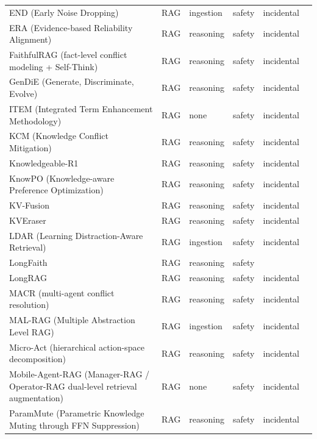 \begin{longtable}{@{}>{\raggedright\arraybackslash}p{}lllll@{}}
END (Early Noise Dropping) & RAG & ingestion & safety & incidental & \cite{jin-2025-end} \\
ERA (Evidence-based Reliability Alignment) & RAG & reasoning & safety & incidental & \cite{shin-2026-era} \\
FaithfulRAG (fact-level conflict modeling + Self-Think) & RAG & reasoning & safety & incidental & \cite{zhang-2025-faithfulrag} \\
GenDiE (Generate, Discriminate, Evolve) & RAG & reasoning & safety & incidental & \cite{li-2025-generate} \\
ITEM (Integrated Term Enhancement Methodology) & RAG & none & safety & incidental & \cite{bei-2024-manufacturing} \\
KCM (Knowledge Conflict Mitigation) & RAG & reasoning & safety & incidental & \cite{an-2026-enhancing} \\
Knowledgeable-R1 & RAG & reasoning & safety & incidental & \cite{lin-2025-resisting} \\
KnowPO (Knowledge-aware Preference Optimization) & RAG & reasoning & safety & incidental & \cite{zhang-2024-knowpo} \\
KV-Fusion & RAG & reasoning & safety & incidental & \cite{oh-2025-parallel} \\
KVEraser & RAG & reasoning & safety & incidental & \cite{li-2026-kveraser} \\
LDAR (Learning Distraction-Aware Retrieval) & RAG & ingestion & safety & incidental & \cite{shim-2025-rag} \\
LongFaith & RAG & reasoning & safety &  & \cite{yang-2025-longfaith} \\
LongRAG & RAG & reasoning & safety & incidental & \cite{zhao-2024-longrag} \\
MACR (multi-agent conflict resolution) & RAG & reasoning & safety & incidental & \cite{peng-2026-navigating} \\
MAL-RAG (Multiple Abstraction Level RAG) & RAG & ingestion & safety & incidental & \cite{zheng-2025-multiple} \\
Micro-Act (hierarchical action-space decomposition) & RAG & reasoning & safety & incidental & \cite{huo-2025-microact} \\
Mobile-Agent-RAG (Manager-RAG / Operator-RAG dual-level retrieval augmentation) & RAG & none & safety & incidental & \cite{zhou-2025-mobileagentrag} \\
ParamMute (Parametric Knowledge Muting through FFN Suppression) & RAG & reasoning & safety & incidental & \cite{huang-2025-parammute} \\

\end{longtable}
